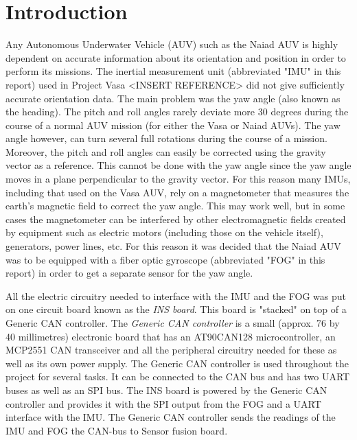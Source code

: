 \section{Introduction}\label{sec:introduction}
Any Autonomous Underwater Vehicle (AUV) such as the Naiad AUV is highly dependent on accurate information about its orientation and position in order to perform its missions. The inertial measurement unit (abbreviated "IMU" in this report) used in Project Vasa <INSERT REFERENCE> did not give sufficiently accurate orientation data. The main problem was the yaw angle (also known as the heading). \newline
The pitch and roll angles rarely deviate more 30 degrees during the course of a normal AUV mission (for either the Vasa or Naiad AUVs). The yaw angle however, can turn several full rotations during the course of a mission. Moreover, the pitch and roll angles can easily be corrected using the gravity vector as a reference. This cannot be done with the yaw angle since the yaw angle moves in a plane perpendicular to the gravity vector. \newline
For this reason many IMUs, including that used on the Vasa AUV, rely on a magnetometer that measures the earth's magnetic field to correct the yaw angle. This may work well, but in some cases the magnetometer can be interfered by other electromagnetic fields created by equipment such as electric motors (including those on the vehicle itself), generators, power lines, etc. For this reason it was decided that the Naiad AUV was to be equipped with a fiber optic gyroscope (abbreviated "FOG" in this report) in order to get a separate sensor for the yaw angle.

All the electric circuitry needed to interface with the IMU and the FOG was put on one circuit board known as the \emph{INS board}. This board is "stacked" on top of a Generic CAN controller. The \emph{Generic CAN controller} is a small (approx. 76 by 40 millimetres) electronic board that has an AT90CAN128 microcontroller, an MCP2551 CAN transceiver and all the peripheral circuitry needed for these as well as its own power supply. The Generic CAN controller is used throughout the project for several tasks. It can be connected to the CAN bus and has two UART buses as well as an SPI bus. \newline
The INS board is powered by the Generic CAN controller and provides it with the SPI output from the FOG and a UART interface with the IMU. The Generic CAN controller sends the readings of the IMU and FOG the CAN-bus to Sensor fusion board.
